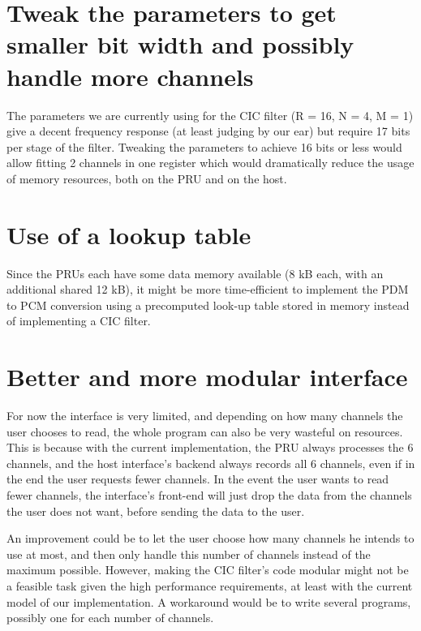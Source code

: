 \documentclass[]{report}
\begin{document}
\hypertarget{tweak-the-parameters-to-get-smaller-bit-width-and-possibly-handle-more-channels}{%
\section{Tweak the parameters to get smaller bit width and possibly
handle more
channels}\label{tweak-the-parameters-to-get-smaller-bit-width-and-possibly-handle-more-channels}}

The parameters we are currently using for the CIC filter (R = 16, N = 4, M = 1) give a decent frequency response (at least judging by our ear) but require 17 bits per stage of the filter. Tweaking the parameters to achieve 16 bits or less would allow fitting 2 channels in one register which would dramatically reduce the usage of memory resources, both on the PRU and on the host.


\hypertarget{use-of-a-lookup-table}{%
\section{Use of a lookup table}\label{use-of-a-lookup-table}}

Since the PRUs each have some data memory available (8 kB each, with an additional shared 12 kB), it might be more time-efficient to implement the PDM to PCM conversion using a precomputed look-up table stored in memory instead of implementing a CIC filter.

\hypertarget{better-and-more-modular-interface}{%
\section{Better and more modular
interface}\label{better-and-more-modular-interface}}

For now the interface is very limited, and depending on how many channels the user chooses to read, the whole program can also be very wasteful on resources. This is because with the current implementation, the PRU always processes the 6 channels, and the host interface's backend always records all 6 channels, even if in the end the user requests fewer channels. In the event the user wants to read fewer channels, the interface's front-end will just drop the data from the channels the user does not want, before sending the data to the user.

An improvement could be to let the user choose how many channels he intends to use at most, and then only handle this number of channels instead of the maximum possible. However, making the CIC filter's code modular might not be a feasible task given the high performance requirements, at least with the current model of our implementation. A workaround would be to write several programs, possibly one for each number of channels.
\end{document}
